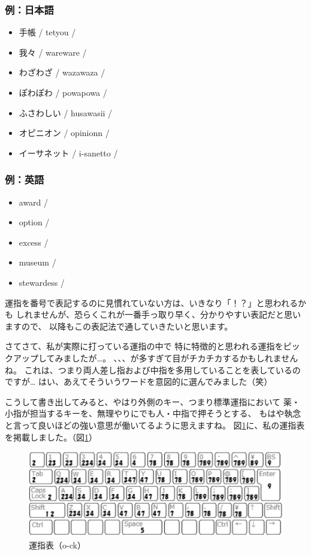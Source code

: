 \subsubsection*{例：日本語}
\begin{itemize}
 \item 手帳 / tetyou / 
 \item 我々 / wareware / 
 \item わざわざ / wazawaza / 
 \item ぽわぽわ / powapowa / 
 \item ふさわしい / husawasii / 
 \item オピニオン / opinionn / 
 \item イーサネット / i-sanetto / 
\end{itemize}
\subsubsection*{例：英語}
\begin{itemize}
 \item award / 
 \item option / 
 \item excess / 
 \item museum / 
 \item stewardess / 
\end{itemize}
運指を番号で表記するのに見慣れていない方は、いきなり「！？」と思われるかも
しれませんが、恐らくこれが一番手っ取り早く、分かりやすい表記だと思いますので、
以降もこの表記法で通していきたいと思います。

さてさて、私が実際に打っている運指の中で
特に特徴的と思われる運指をピックアップしてみましたが…。
、、、が多すぎて目がチカチカするかもしれませんね。
これは、つまり両人差し指および中指を多用していることを表しているのですが…
はい、あえてそういうワードを意図的に選んでみました（笑）


こうして書き出してみると、やはり外側のキー、つまり標準運指において
薬・小指が担当するキーを、無理やりにでも人・中指で押そうとする、
もはや執念と言って良いほどの強い意思が働いてるように思えますね。
図\ref{fig1_unsiock}に、私の運指表を掲載しました。（図\ref{fig1_unsiock}）

\begin{figure}
 \begin{center}
   \includegraphics[width=14cm,clip]{res_o_ck/fig1_unsiock.eps}
 \end{center}
 \caption{運指表（o-ck）}
 \label{fig1_unsiock}
\end{figure}

